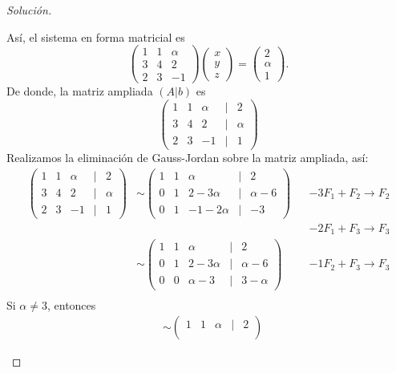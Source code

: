 \documentclass[a4,11pt]{aleph-notas}
\begin{document}
\begin{proof}[Solución]
\begin{enumerate}
    Así, el sistema en forma matricial es
    \[
        \begin{pmatrix}
        1&1&\alpha\\3&4&2\\2&3&-1
        \end{pmatrix}
        \begin{pmatrix}
        x \\ y\\ z
        \end{pmatrix}
        =
        \begin{pmatrix}
        2 \\ \alpha\\ 1
        \end{pmatrix}.
    \]
    De donde, la matriz ampliada $(A|b)$ es
    \[
        \begin{pmatrix}
        1&1&\alpha&|&2\\
        3&4&2&|&\alpha\\
        2&3&-1&|&1
        \end{pmatrix}
    \]
    Realizamos la eliminación de Gauss-Jordan sobre la matriz ampliada, así:
        \begin{align*}
        \begin{pmatrix}
        1&1&\alpha&|&2\\
        3&4&2&|&\alpha\\
        2&3&-1&|&1
        \end{pmatrix}
        & \sim 
        \begin{pmatrix}
        1&1&\alpha&|&2\\
        0&1&2-3\alpha&|&\alpha - 6\\
        0&1&-1-2 \alpha&|&-3
        \end{pmatrix}
        && -3F_1+F_2\to F_2\\
        &&&-2F_1+F_3\to F_3\\
        & \sim 
        \begin{pmatrix}
        1&1&\alpha&|&2\\
        0&1&2-3\alpha&|&\alpha - 6\\
        0&0&\alpha - 3&|& 3 - \alpha
        \end{pmatrix}
        && -1F_2+F_3\to F_3\\
        \end{align*}
    Si $\alpha \neq 3$, entonces 
    \begin{align*}
        & \sim 
        \begin{pmatrix}
        1&1&\alpha&|&2\\

\end{pmatrix}
\end{align*}
\end{enumerate}
\end{proof}
\end{document}
